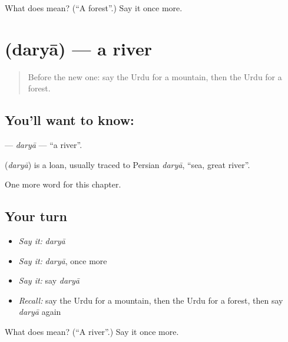 \begin{tcolorbox}[breakable,colback=teal!4,colframe=teal!35!black,title={Before you move on}]
What does  mean? (\textquotedblleft{}A forest\textquotedblright{}.) Say it once more.
\end{tcolorbox}
\section[\texorpdfstring{\ur{دریا} (daryā)}{دریا (daryā)}]{ (daryā) — a river}

\label{lesson:UR-C64-darya}



\begin{quote}
Before the new one: say the Urdu for a mountain, then the Urdu for a forest.
\end{quote}

\subsection*{You'll want to know: }
\textbf{} — \emph{daryā} — \textquotedblleft{}a river\textquotedblright{}.

\begin{cousinweb}
\textbf{} (\emph{daryā}) is a loan, usually traced to Persian \emph{daryā}, \textquotedblleft{}sea, great river\textquotedblright{}.
\end{cousinweb}

\begin{grammarlens}[title={What you've built}]
One more word for this chapter.
\end{grammarlens}

\subsection*{Your turn}
\begin{itemize}
\raggedright
  \item \emph{Say it:} \emph{daryā}
  \item \emph{Say it:} \emph{daryā}, once more
  \item \emph{Say it:} say \emph{daryā}
  \item \emph{Recall:} say the Urdu for a mountain, then the Urdu for a forest, then say \emph{daryā} again
\end{itemize}

\begin{tcolorbox}[breakable,colback=teal!4,colframe=teal!35!black,title={Before you move on}]
What does  mean? (\textquotedblleft{}A river\textquotedblright{}.) Say it once more.
\end{tcolorbox}

